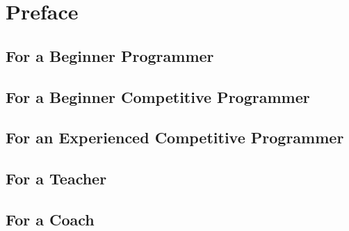 \section*{Preface}

\subsection*{For a Beginner Programmer}

\subsection*{For a Beginner Competitive Programmer}

\subsection*{For an Experienced Competitive Programmer}

\subsection*{For a Teacher}

\subsection*{For a Coach}

